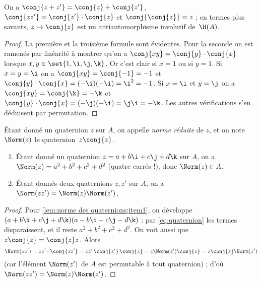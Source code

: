 \documentclass[11pt, %
  title in boldface,
  theorem in new line,
  theorem numbering = section,
  number theorems separately,
  simple name,
]{beaulivre}
\begin{document}
    \begin{lemma}
        On a \( \conj{z+z'} = \conj{z}+\conj{z'} \), \( \conj{z z'} = \conj{z'}\cdot\conj{z} \) et \( \conj{\conj{z}} = z \) ; en termes plus savants, \( z \mapsto \conj{z} \) est un antiautomorphisme involutif de~\( \H(A) \).
    \end{lemma}
    \begin{proof}
        La première et la troisième formule sont évidentes. Pour la seconde on est ramenés par linéarité à montrer qu'on a \( \conj{xy} = \conj{y} \cdot \conj{x} \) lorsque \( x,y \in \set{1,\i,\j,\k} \). Or c'est clair si \( x = 1 \) ou si \( y = 1 \). Si \( x = y = \i \) on a \( \conj{xy} = \conj{-1} = -1 \) et \( \conj{y} \cdot \conj{x} = (-\i)(-\i) = \i^2 = -1 \). Si \( x = \i \) et \( y = \j \) on a \( \conj{xy} = \conj{\k} = -\k \) et \( \conj{y} \cdot \conj{x} = (-\j)(-\i) = \j\i = -\k \). Les autres vérifications s'en déduisent par permutation.
    \end{proof}

    Étant donné un quaternion \( z \) sur \( A \), on appelle \emph{norme réduite} de \( z \), et on note \( \Norm(z) \) le quaternion~\( z \conj{z} \).

    \begin{lemma}\label{lem:norme des quaternions}
        \begin{enumerate}
            \item \label{lem:norme des quaternions;item1} Étant donné un quaternion \( z = a+b\i+c\j+d\k \) sur \( A \), on a \( \Norm(z) = a^2+b^2+c^2+d^2 \) (quatre carrés !), donc \( \Norm(z) \in A \).
            \item \label{lem:norme des quaternions;item2} Étant donnés deux quaternions \( z, z' \) sur \( A \), on a \( \Norm(zz') = \Norm(z)\Norm(z') \).
        \end{enumerate}
    \end{lemma}
    \begin{proof}
        Pour \ref{lem:norme des quaternions;item1}, on développe \( (a+b\i+c\j+d\k)(a-b\i-c\j-d\k) \) : par \eqref{eq:quaternion} les termes  disparaissent, et il reste \( a^2+b^2+c^2+d^2 \). On voit aussi que \( z \conj{z} = \conj{z} z \). Alors
        \[
            \Norm(zz') = zz' \cdot \conj{zz'} = zz' \,\conj{z'} \,\conj{z} = z \Norm(z') \conj{z} = z \conj{z} \Norm(z')
        \]
        (car l'élément \( \Norm(z') \) de \( A \) est permutable à tout quaternion) ; d'où \( \Norm(zz') = \Norm(z)\Norm(z') \).
    \end{proof}
\end{document}
